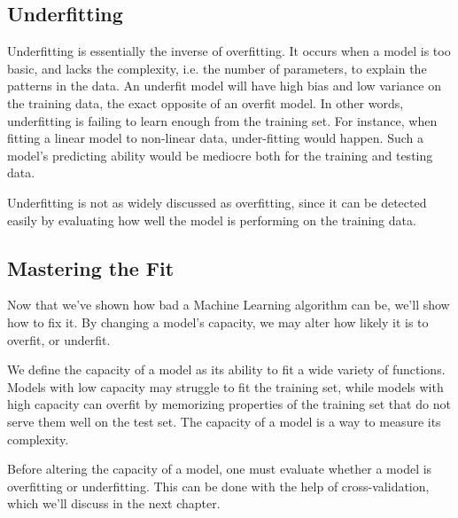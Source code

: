 \documentclass{article}
\begin{document}
\subsection{Underfitting}%
  \label{sub:Underfitting}
  Underfitting is essentially the inverse of overfitting. It occurs when a model is too basic, and lacks the complexity, i.e. the number of parameters, to explain the patterns in the data. An underfit model will have high bias and low variance on the training data, the exact opposite of an overfit model. In other words, underfitting is failing to learn enough from the training set. For instance, when fitting a linear model to non-linear data, under-fitting would happen. Such a model's predicting ability would be mediocre both for the training and testing data.

  Underfitting is not as widely discussed as overfitting, since it can be detected easily by evaluating how well the model is performing on the training data. 

 \subsection{Mastering the Fit}%
  \label{sub:Mastering the Fit}
  Now that we've shown how bad a Machine Learning algorithm can be, we'll show how to fix it. By changing a model's capacity, we may alter how likely it is to overfit, or underfit. 
  \begin{definition}[Capacity]
   We define the capacity of a model as its ability to fit a wide variety of
functions. Models with low capacity may struggle to fit the training set, while models
with high capacity can overfit by memorizing properties of the training set that do
not serve them well on the test set. The capacity of a model is a way to measure its complexity.
  \end{definition}

  Before altering the capacity of a model, one must evaluate whether a model is overfitting or underfitting. This can be done with the help of cross-validation, which we'll discuss in the next chapter.
\end{document}
